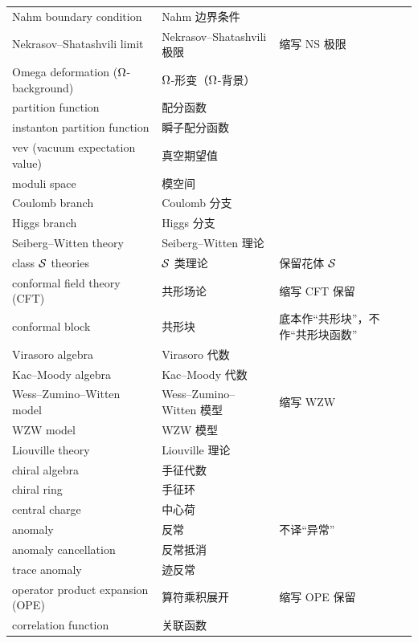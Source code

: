 \begin{longtable}{@{}p{}p{}p{}@{}}
Nahm boundary condition     & Nahm 边界条件       & \\
Nekrasov--Shatashvili limit & Nekrasov--Shatashvili 极限 & 缩写 NS 极限 \\
Omega deformation ($\Omega$-background) & $\Omega$-形变（$\Omega$-背景） & \\
partition function          & 配分函数            & \\
instanton partition function & 瞬子配分函数       & \\
vev (vacuum expectation value) & 真空期望值       & \\
moduli space                & 模空间              & \\
Coulomb branch              & Coulomb 分支        & \\
Higgs branch                & Higgs 分支          & \\
Seiberg--Witten theory      & Seiberg--Witten 理论 & \\
class $\mathcal{S}$ theories        & $\mathcal{S}$ 类理论        & 保留花体 $\mathcal{S}$ \\
conformal field theory (CFT) & 共形场论           & 缩写 CFT 保留 \\
conformal block             & 共形块              & 底本作“共形块”，不作“共形块函数” \\
Virasoro algebra            & Virasoro 代数       & \\
Kac--Moody algebra          & Kac--Moody 代数     & \\
Wess--Zumino--Witten model  & Wess--Zumino--Witten 模型 & 缩写 WZW \\
WZW model                   & WZW 模型            & \\
Liouville theory            & Liouville 理论      & \\
chiral algebra              & 手征代数            & \\
chiral ring                 & 手征环              & \\
central charge              & 中心荷              & \\
anomaly                     & 反常                & 不译“异常” \\
anomaly cancellation        & 反常抵消            & \\
trace anomaly               & 迹反常              & \\
operator product expansion (OPE) & 算符乘积展开   & 缩写 OPE 保留 \\
correlation function        & 关联函数            & \\

\end{longtable}
